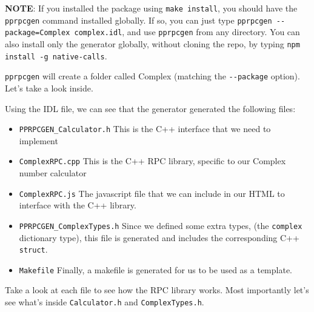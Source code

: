 \textbf{NOTE}: If you installed the package using \texttt{make install},
you should have the \texttt{pprpcgen} command installed globally. If so,
you can just type \texttt{pprpcgen -{}-package=Complex complex.idl}, and
use \texttt{pprpcgen} from any directory. You can also install only the
generator globally, without cloning the repo, by typing
\texttt{npm install -g native-calls}.

\texttt{pprpcgen} will create a folder called Complex (matching the
\texttt{-{}-package} option). Let's take a look inside.

\begin{Shaded}
\begin{Highlighting}[]
 
\end{Highlighting}
\end{Shaded}

Using the IDL file, we can see that the generator generated the
following files:

\begin{itemize}
\itemsep1pt\parskip0pt
\item
  \texttt{PPRPCGEN\_Calculator.h} This is the C++ interface that we need
  to implement
\item
  \texttt{ComplexRPC.cpp} This is the C++ RPC library, specific to our
  Complex number calculator
\item
  \texttt{ComplexRPC.js} The javascript file that we can include in our
  HTML to interface with the C++ library.
\item
  \texttt{PPRPCGEN\_ComplexTypes.h} Since we defined some extra types,
  (the \texttt{complex} dictionary type), this file is generated and
  includes the corresponding C++ \texttt{struct}.
\item
  \texttt{Makefile} Finally, a makefile is generated for us to be used
  as a template.
\end{itemize}

Take a look at each file to see how the RPC library works. Most
importantly let's see what's inside \texttt{Calculator.h} and
\texttt{ComplexTypes.h}.

\begin{Shaded}
\begin{Highlighting}[]
 
\end{Highlighting}
\end{Shaded}

\begin{Shaded}
\begin{Highlighting}[]
  \NormalTok{\{}
   
   
\end{Highlighting}
\end{Shaded}

